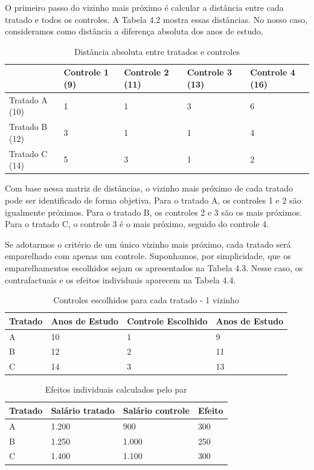 O primeiro passo do vizinho mais próximo é calcular a distância entre cada tratado e todos os controles. A Tabela 4.2 mostra essas distâncias. No nosso caso, consideramos como distância a diferença absoluta dos anos de estudo.

\begin{table}[h]
    \centering
    \begin{tabular}{lllll}
         & Controle 1 (9) & Controle 2 (11) & Controle 3 (13) & Controle 4 (16) \\\midrule
        Tratado A (10) & 1 & 1 & 3 & 6\\
        Tratado B (12) & 3 & 1 & 1 & 4\\
        Tratado C (14) & 5 & 3 & 1 & 2 \\\bottomrule
    \end{tabular}
    \caption{Distância absoluta entre tratados e controles}
    \label{tab:placeholder}
\end{table}

Com base nessa matriz de distâncias, o vizinho mais próximo de cada tratado pode ser identificado de forma objetiva. Para o tratado A, os controles 1 e 2 são igualmente próximos. Para o tratado B, os controles 2 e 3 são os mais próximos. Para o tratado C, o controle 3 é o mais próximo, seguido do controle 4.

Se adotarmos o critério de um único vizinho mais próximo, cada tratado será emparelhado com apenas um controle. Suponhamos, por simplicidade, que os emparelhamentos escolhidos sejam os apresentados na Tabela 4.3. Nesse caso, os contrafactuais e os efeitos individuais aparecem na Tabela 4.4.


\begin{table}[h]
    \centering
    \begin{tabular}{llll}
        Tratado & Anos de Estudo & Controle Escolhido & Anos de Estudo\\\midrule
        A & 10 & 1 & 9\\
        B & 12 & 2 & 11\\
        C & 14 & 3 & 13\\\bottomrule
    \end{tabular}
    \caption{Controles escolhidos para cada tratado - 1 vizinho}
    \label{tab:placeholder}
\end{table}


\begin{table}[h]
    \centering
    \begin{tabular}{llll}
        Tratado & Salário tratado & Salário controle & Efeito\\\midrule
        A & 1.200 & 900 & 300\\
        B & 1.250 & 1.000 & 250\\
        C & 1.400 & 1.100 & 300\\\bottomrule
    \end{tabular}
    \caption{Efeitos individuais calculados pelo par}
    \label{tab:placeholder}
\end{table}

